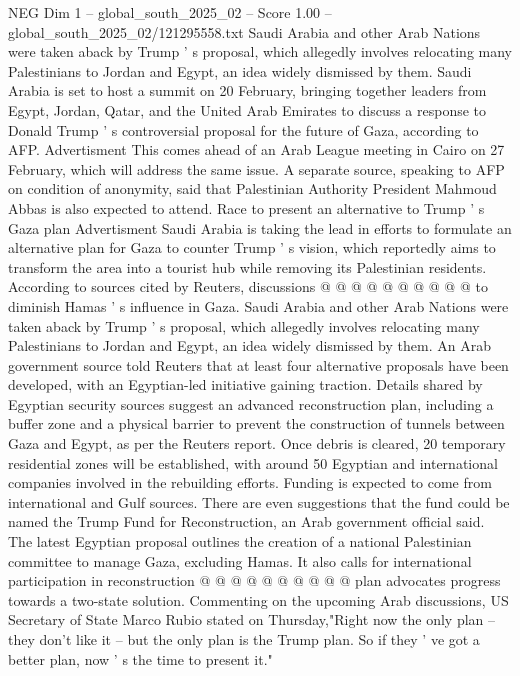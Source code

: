 \begin{textsample}{NEG Dim 1 – global\_south\_2025\_02 – Score 1.00 – global\_south\_2025\_02/121295558.txt}  \label{ex:f1_neg_030}
Saudi Arabia and other Arab Nations were taken aback by Trump ' s proposal, which allegedly involves relocating many Palestinians to Jordan and Egypt, an idea widely dismissed by them.
Saudi Arabia is set to host a summit on 20 February, bringing together leaders from Egypt, Jordan, Qatar, and the United Arab Emirates to discuss a response to Donald Trump ' s controversial proposal for the future of Gaza, according to AFP.
Advertisment This comes ahead of an Arab League meeting in Cairo on 27 February, which will address the same issue.
A separate source, speaking to AFP on condition of anonymity, said that Palestinian Authority President Mahmoud Abbas is also expected to attend.
Race to present an alternative to Trump ' s Gaza plan Advertisment Saudi Arabia is taking the lead in efforts to formulate an alternative plan for Gaza to counter Trump ' s vision, which reportedly aims to transform the area into a tourist hub while removing its Palestinian residents.
According to sources cited by Reuters, discussions @ @ @ @ @ @ @ @ @ @ to diminish Hamas ' s influence in Gaza.
Saudi Arabia and other Arab Nations were taken aback by Trump ' s proposal, which allegedly involves relocating many Palestinians to Jordan and Egypt, an idea widely dismissed by them.
An Arab government source told Reuters that at least four alternative proposals have been developed, with an Egyptian-led initiative gaining traction.
Details shared by Egyptian security sources suggest an advanced reconstruction plan, including a buffer zone and a physical barrier to prevent the construction of tunnels between Gaza and Egypt, as per the Reuters report.
Once debris is cleared, 20 temporary residential zones will be established, with around 50 Egyptian and international companies involved in the rebuilding efforts.
Funding is expected to come from international and Gulf sources.
There are even suggestions that the fund could be named the Trump Fund for Reconstruction, an Arab government official said.
The latest Egyptian proposal outlines the creation of a national Palestinian committee to manage Gaza, excluding Hamas.
It also calls for international participation in reconstruction @ @ @ @ @ @ @ @ @ @ plan advocates progress towards a two-state solution.
Commenting on the upcoming Arab discussions, US Secretary of State Marco Rubio stated on Thursday,"Right now the only plan -- they don't like it -- but the only plan is the Trump plan.
So if they ' ve got a better plan, now ' s the time to present it."

\end{textsample}
